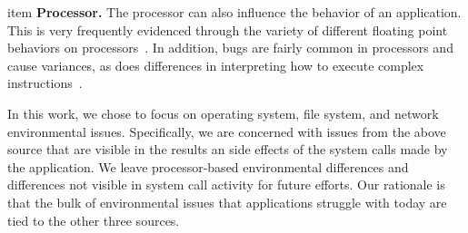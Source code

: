 \begin{itemize}
item {\bf Processor.}  The processor can also influence the
behavior of an application.  This is very frequently
evidenced through the variety of different floating point behaviors on
processors~\cite{ArbitraryPrecision}.  In addition, bugs are fairly common
in processors and cause variances, as does differences in interpreting
how to execute complex instructions~\cite{Microarch}.

\end{itemize}

In this work, we chose to focus on operating system,
file system, and network
environmental issues.
Specifically, we are concerned with issues from the above source that are
visible in the results an side effects of the system calls made by the
application.  We leave processor-based environmental differences and
differences not visible in system call activity for future efforts.
Our rationale is that the bulk of environmental issues that applications
struggle with today are tied to the other three sources.

